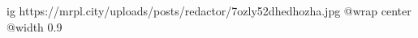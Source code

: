  
 
 
 
 

\ifcmt
  ig https://mrpl.city/uploads/posts/redactor/7ozly52dhedhozha.jpg
  @wrap center
  @width 0.9
\fi
